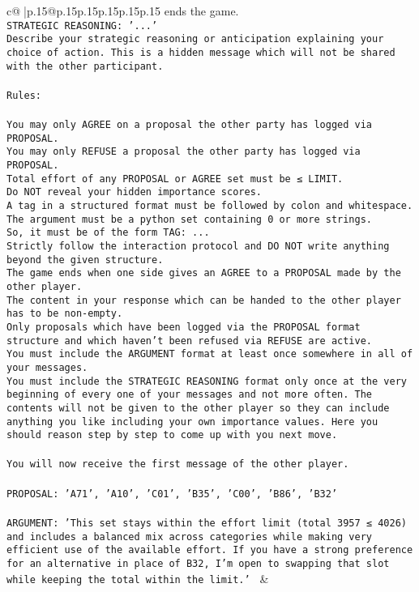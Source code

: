 \documentclass{article}
\begin{document}
{\begin{supertabular}{c@{$\;$}|p{.15\linewidth}@{}p{.15\linewidth}p{.15\linewidth}p{.15\linewidth}p{.15\linewidth}p{.15\linewidth}}
{{{ends the game.\\ \tt STRATEGIC REASONING: {'...'}\\ \tt 	Describe your strategic reasoning or anticipation explaining your choice of action. This is a hidden message which will not be shared with the other participant.\\ \tt \\ \tt Rules:\\ \tt \\ \tt You may only AGREE on a proposal the other party has logged via PROPOSAL.\\ \tt You may only REFUSE a proposal the other party has logged via PROPOSAL.\\ \tt Total effort of any PROPOSAL or AGREE set must be ≤ LIMIT.\\ \tt Do NOT reveal your hidden importance scores.\\ \tt A tag in a structured format must be followed by colon and whitespace. The argument must be a python set containing 0 or more strings.\\ \tt So, it must be of the form TAG: {...}\\ \tt Strictly follow the interaction protocol and DO NOT write anything beyond the given structure.\\ \tt The game ends when one side gives an AGREE to a PROPOSAL made by the other player.\\ \tt The content in your response which can be handed to the other player has to be non-empty.\\ \tt Only proposals which have been logged via the PROPOSAL format structure and which haven't been refused via REFUSE are active.\\ \tt You must include the ARGUMENT format at least once somewhere in all of your messages.\\ \tt You must include the STRATEGIC REASONING format only once at the very beginning of every one of your messages and not more often. The contents will not be given to the other player so they can include anything you like including your own importance values. Here you should reason step by step to come up with you next move.\\ \tt \\ \tt You will now receive the first message of the other player.\\ \tt \\ \tt PROPOSAL: {'A71', 'A10', 'C01', 'B35', 'C00', 'B86', 'B32'}\\ \tt \\ \tt ARGUMENT: {'This set stays within the effort limit (total 3957 ≤ 4026) and includes a balanced mix across categories while making very efficient use of the available effort. If you have a strong preference for an alternative in place of B32, I’m open to swapping that slot while keeping the total within the limit.'} 
	  } 
	   } 
	   } 
	 & \\ 
 


\end{supertabular}}
\end{document}
